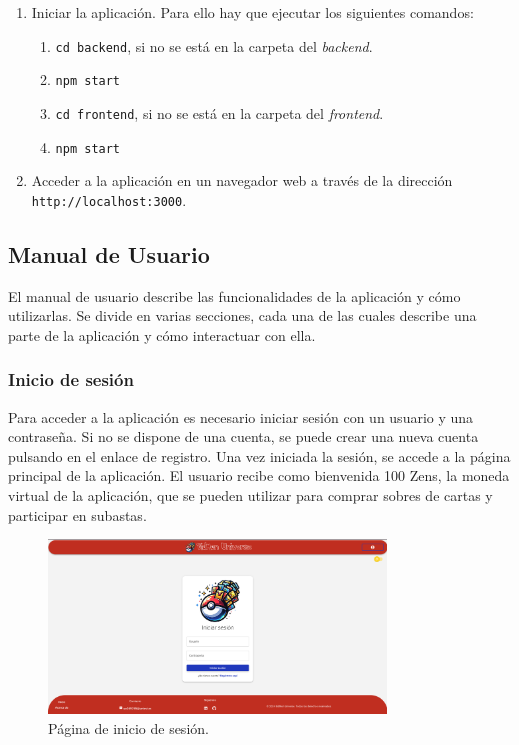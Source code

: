 \begin{enumerate}
\begin{enumerate}
    \item Iniciar la aplicación. Para ello hay que ejecutar los siguientes comandos:
      \begin{enumerate}
          \item \texttt{cd backend}, si no se está en la carpeta del \textit{backend}.
          \item \texttt{npm start}
          \item \texttt{cd frontend}, si no se está en la carpeta del \textit{frontend}.
          \item \texttt{npm start}
      \end{enumerate}
    \item Acceder a la aplicación en un navegador web a través de la dirección \texttt{http://localhost:3000}.
\end{enumerate}


\subsection{Manual de Usuario} 
El manual de usuario describe las funcionalidades de la aplicación y cómo utilizarlas.
Se divide en varias secciones, cada una de las cuales describe una parte de la aplicación y cómo interactuar con ella.

\subsubsection{Inicio de sesión}
Para acceder a la aplicación es necesario iniciar sesión con un usuario y una contraseña.
Si no se dispone de una cuenta, se puede crear una nueva cuenta pulsando en el enlace de registro.
Una vez iniciada la sesión, se accede a la página principal de la aplicación.
El usuario recibe como bienvenida 100 Zens, la moneda virtual de la aplicación, que se pueden utilizar para comprar sobres de cartas
y participar en subastas.

\begin{figure}[H]
    \centering
    \includegraphics[width=0.8\textwidth]{figures/6-Analisis/6-Interfaz/interfaz/login.png}
    \caption{Página de inicio de sesión.}
    \label{fig:m-interfaz-login}
\end{figure}



\end{enumerate}
